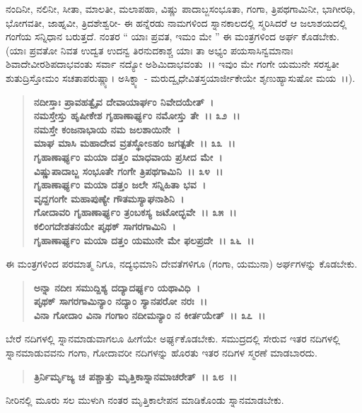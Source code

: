 ನಂದಿನೀ, ನಲಿನೀ, ಸೀತಾ, ಮಾಲತೀ, ಮಲಾಪಹಾ, ವಿಷ್ಣು ಪಾದಾಬ್ಜಸಂಭೂತಾ, ಗಂಗಾ, ತ್ರಿಪಥಗಾಮಿನೀ, ಭಾಗೀರಥಿ, ಭೋಗವತೀ, ಜಾಹ್ನವೀ, ತ್ರಿದಶೇಶ್ವರೀ- ಈ ಹನ್ನೆರಡು ನಾಮಗಳಿಂದ ಸ್ನಾನಕಾಲದಲ್ಲಿ ಸ್ಮರಿಸಿದರೆ ಆ ಜಲಾಶಯದಲ್ಲಿ ಗಂಗೆಯ ಸನ್ನಿಧಾನ ಬರುತ್ತದೆ. ನಂತರ “ ಯಾಃ ಪ್ರವತ, ಇಮಂ ಮೇ ” ಈ ಮಂತ್ರಗಳಿಂದ ಅರ್ಘ ಕೊಡಬೇಕು. (ಯಾಃ ಪ್ರವತೋ ನಿವತ ಉದ್ವತ ಉದನ್ವ ತಿರನುದಕಾಶ್ಚ ಯಾಃ ತಾ ಅಭ್ಯಂ ಪಯಸಾಸಿನ್ವಮಾನಾಃ ಶಿವಾದೇವೀರಶಿಪದಾಭವಂತು ಸರ್ವಾ ನದ್ಯೋ ಅಶಿಮಿದಾಭವಂತು~।। ಇವುಂ ಮೇ ಗಂಗೇ ಯಮುನೇ ಸರಸ್ವತೀ ಶುತುದ್ರಿಸ್ತೋಮಂ ಸಚತಾಪರುಷ್ಣ್ಯಾ। ಅಸಿಕ್ನ್ಯಾ - ಮರುದ್ವೃಧೇವಿತಸ್ತಯಾರ್ಜೀಕೇಯೇ ಶೃಣುಹ್ಯಾಸುಷೋ ಮಯ~।।).

\begin{verse}
\textbf{ನದೀಸ್ತಾಃ ಪ್ರಾವಹತ್ವೈವ ದೇವಾಯಾರ್ಘಂ ನಿವೇದಯೇತ್~।}\\\textbf{ನಮಸ್ತೇಸ್ತು ಹೃಷೀಕೇಶ ಗೃಹಾಣಾರ್ಘ್ಯಂ ನಮೋಸ್ತು ತೇ~।। ೩೨~।।}\\\textbf{ನಮಸ್ತೇ ಕಂಜನಾಭಾಯ ನಮ ಜಲಶಾಯಿನೇ~।}\\\textbf{ಮಾಘ ಮಾಸಿ ಮಹಾದೇವ ವ್ರತಸ್ಥೋಽಹಂ ಜಗತ್ಪತೇ~।। ೩೩~।।}\\\textbf{ಗೃಹಾಣಾರ್ಘ್ಯಂ ಮಯಾ ದತ್ತಂ ಮಾಧವಾಯ ಪ್ರಸೀದ ಮೇ~।}\\\textbf{ವಿಷ್ಣುಪಾದಾಬ್ಜ ಸಂಭೂತೇ ಗಂಗೇ ತ್ರಿಪಥಗಾಮಿನಿ~।। ೩೪~।।}\\\textbf{ಗೃಹಾಣಾರ್ಘ್ಯಂ ಮಯಾ ದತ್ತಂ ಜಲೇ ಸನ್ನಿಹಿತಾ ಭವ~।}\\\textbf{ವೃದ್ದಗಂಗೇ ಮಹಾಪುಣ್ಯೇ ಗೌತಮಸ್ಯಾಘನಾಶಿನಿ~।}\\\textbf{ಗೋದಾವರಿ ಗೃಹಾಣಾರ್ಘ್ಯಂ ತ್ರಂಬಕಸ್ಯ ಜಟೋದ್ಭವೇ~।। ೩೫~।।}\\\textbf{ಕಲಿಂಗದೇಶತನಯೇ ಪೃಥಕ್ ಸಾಗರಗಾಮಿನಿ~।}\\\textbf{ಗೃಹಾಣಾರ್ಘ್ಯಂ ಮಯಾ ದತ್ತಂ ಯಮುನೇ ಮೇ ಫಲಪ್ರದೇ~।। ೩೬~।।}
\end{verse}

ಈ ಮಂತ್ರಗಳಿಂದ ಪರಮಾತ್ಮ ನಿಗೂ, ನದ್ಯಭಿಮಾನಿ ದೇವತೆಗಳಿಗೂ (ಗಂಗಾ, ಯಮುನಾ) ಅರ್ಘಗಳನ್ನು ಕೊಡಬೇಕು.

\begin{verse}
\textbf{ಅನ್ನಾ ನದೀಃ ಸಮುದ್ದಿಶ್ಯ ದದ್ಯಾದರ್ಘ್ಯಂ ಯಥಾವಿಧಿ~।}\\\textbf{ಪೃಥಕ್ ಸಾಗರಗಾಮಿನ್ಯಾಂ ನದ್ಯಾಂ ಸ್ಯಾನಪರೋ ನರಃ~।।}\\\textbf{ವಿನಾ ಗೋದಾಂ ವಿನಾ ಗಂಗಾಂ ನದೀಮನ್ಯಾಂ ನ ಕೀರ್ತಯೇತ್~।। ೩೭~।।}
\end{verse}

ಬೇರೆ ನದಿಗಳಲ್ಲಿ ಸ್ನಾನಮಾಡುವಾಗಲೂ ಹೀಗೆಯೇ ಅರ್ಘ್ಯಕೊಡಬೇಕು. ಸಮುದ್ರದಲ್ಲಿ ಸೇರುವ ಇತರ ನದಿಗಳಲ್ಲಿ ಸ್ನಾನಮಾಡುವವನು ಗಂಗಾ, ಗೋದಾವರೀ ನದಿಗಳನ್ನು ಹೊರತು ಇತರ ನದಿಗಳ ಸ್ಮರಣೆ ಮಾಡಬಾರದು.

\begin{verse}
\textbf{ತ್ರಿರ್ನಿರ್ಮೃಜ್ಯ ಚ ಪಶ್ಚಾತ್ತು ಮೃತ್ತಿಕಾಸ್ನಾನಮಾಚರೇತ್~।। ೩೮~।।} 
\end{verse}

ನೀರಿನಲ್ಲಿ ಮೂರು ಸಲ ಮುಳುಗಿ ನಂತರ ಮೃತ್ತಿಕಾಲೇಪನ ಮಾಡಿಕೊಂಡು ಸ್ನಾನಮಾಡಬೇಕು.

